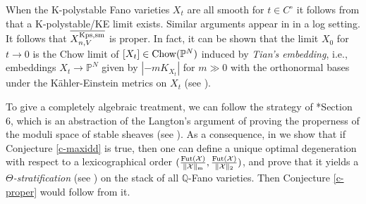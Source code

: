 \documentclass[12pt,reqno]{amsart}%
\newcommand{\cX}{{\mathcal{X}}}
\theoremstyle{definition}
\theoremstyle{remark}
\begin{document}
When the K-polystable Fano varieties $X_t$ are all smooth for $t\in C^{\circ}$ it follows from that \cite{DS14} a K-polystable/KE limit exists. Similar arguments appear in \cite{CDS, Tia15} in a log setting. It follows that $\overline{X^{\rm Kps, sm}_{n,V}}$ is proper.
In fact, it can be shown that the limit $X_0$ for $t\to 0$ is the Chow limit of $[X_t]\in {\rm Chow}(\mathbb{P}^N)$ induced by {\it Tian's embedding}, i.e.,  embeddings $X_t\to \mathbb{P}^N$ given by $|-mK_{X_t}|$ for $m\gg 0$ with the orthonormal bases under the K\"ahler-Einstein metrics on $X_t$ (see \cite{CDS, Tia15, LWX19}). 

To give a completely algebraic treatment, we can follow the strategy of \cite{AHH18}*{Section 6}, which is an abstraction of the Langton's argument of proving the properness of the moduli space of stable sheaves (see \cite{Lan75}). As a consequence, in \cite{BHLX20} we show that if Conjecture \ref{c-maxidd} is true, then one can define a unique optimal degeneration with respect to a lexicographical order $(\frac{\rm Fut(\cX)}{\lVert \cX \rVert_{\rm m} }, \frac{\rm Fut(\cX)}{\lVert \cX \rVert_{\rm 2} })$, and prove that it yields a \emph{$\Theta$-stratification} (see \cite{HL14}) on the stack of all $\mathbb Q$-Fano varieties.  Then  Conjecture \ref{c-proper} would follow from it.  
\end{document}
